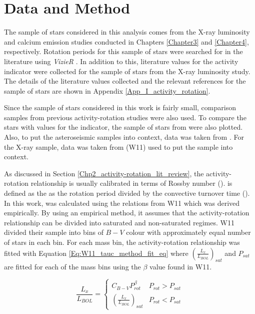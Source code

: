 \section{Data and Method}

The sample of stars considered in this analysis comes from the X-ray luminosity and calcium emission studies conducted in Chapters \ref{Chapter3} and \ref{Chapter4}, respectively. Rotation periods for this sample of stars were searched for in the literature using \textit{VizieR} \citep{Ochsenbein_etal_2000}. In addition to this, literature values for the \Rprime activity indicator were collected for the sample of stars from the X-ray luminosity study. The details of the literature values collected and the relevant references for the sample of stars are shown in Appendix \ref{App_I_activity_rotation}.

Since the sample of stars considered in this work is fairly small, comparison samples from previous activity-rotation studies were also used. To compare the stars with values for the \Rprime indicator, the sample of stars from \citet{Metcalfe_etal_2016} were also plotted. Also, to put the asteroseismic samples into context, data was taken from \citet{Baliunas_etal_1996}. For the X-ray sample, data was taken from \citet{Wright_etal_2011} (W11) used to put the sample into context.

As discussed in Section \ref{Chp2_activity-rotation_lit_review}, the activity-rotation relationship is usually calibrated in terms of Rossby number (\Ro). \Ro is defined as the as the rotation period divided by the convective turnover time (\tauc). In this work, \tauc was calculated using the relations from W11 which was derived empirically. By using an empirical method, it assumes that the activity-rotation relationship can be divided into saturated and non-saturated regimes. W11 divided their sample into bins of $B-V$ colour with approximately equal number of stars in each bin. For each mass bin, the activity-rotation relationship was fitted with Equation \ref{Eq:W11_tauc_method_fit_eq} where $(\frac{L_{x}}{L_{BOL}})_{sat}$ and $P_{sat}$ are fitted for each of the mass bins using the $\beta$ value found in W11.

\begin{equation}
    \frac{L_{x}}{L_{BOL}} = 
    \begin{cases}
        C_{B-V}P_{rot}^{\beta} & P_{rot} > P_{sat} \\
        (\frac{L_{x}}{L_{BOL}})_{sat} & P_{rot} < P_{sat}
    \end{cases}
    \label{Eq:W11_tauc_method_fit_eq}
\end{equation}

